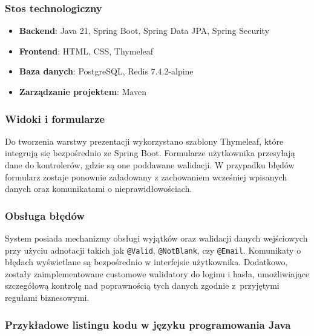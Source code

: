 \documentclass[12pt]{article}
\begin{document}
\subsubsection{Stos technologiczny}
\begin{itemize}
	\item \textbf{Backend}: Java 21, Spring Boot, Spring Data JPA, Spring Security
	\item \textbf{Frontend}: HTML, CSS, Thymeleaf
	\item \textbf{Baza danych}: PostgreSQL, Redis 7.4.2-alpine
	\item \textbf{Zarządzanie projektem}: Maven
\end{itemize}

\subsubsection{Widoki i formularze}
Do tworzenia warstwy prezentacji wykorzystano szablony Thymeleaf, które integrują się bezpośrednio ze Spring Boot. Formularze użytkownika przesyłają dane do kontrolerów, gdzie są one poddawane walidacji. W przypadku błędów formularz zostaje ponownie załadowany z zachowaniem wcześniej wpisanych danych oraz komunikatami o nieprawidłowościach.

\subsubsection{Obsługa błędów}
System posiada mechanizmy obsługi wyjątków oraz walidacji danych wejściowych przy użyciu adnotacji takich jak \texttt{@Valid}, \texttt{@NotBlank}, czy \texttt{@Email}. Komunikaty o błędach wyświetlane są bezpośrednio w interfejsie użytkownika. Dodatkowo, zostały zaimplementowane customowe walidatory do loginu i hasła, umożliwiające szczegółową kontrolę nad poprawnością tych danych zgodnie z~przyjętymi regułami biznesowymi.
\newpage
\subsubsection{Przykładowe listingu kodu w języku programowania Java}
	
\end{document}
